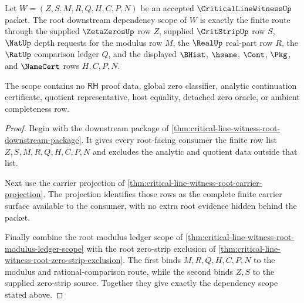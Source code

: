 \begin{theorem}
\label{thm:critical-line-witness-root-dependency-scope}
Let $W=(Z,S,M,R,Q,H,C,P,N)$ be an accepted $\CriticalLineWitnessUp$ packet.
The root downstream dependency scope of $W$ is exactly the finite route through
the supplied $\ZetaZerosUp$ row $Z$, supplied $\CritStripUp$ row $S$,
$\NatUp$ depth requests for the modulus row $M$, the $\RealUp$ real-part row
$R$, the $\RatUp$ comparison ledger $Q$, and the displayed $\BHist$,
$\hsame$, $\Cont$, $\Pkg$, and $\NameCert$ rows $H,C,P,N$.

The scope contains no $\mathsf{RH}$ proof data, global zero classifier, analytic
continuation certificate, quotient representative, host equality, detached zero
oracle, or ambient completeness row.
\end{theorem}
\begin{proof}
Begin with the downstream package of
\autoref{thm:critical-line-witness-root-downstream-package}. It gives every
root-facing consumer the finite row list $Z,S,M,R,Q,H,C,P,N$ and excludes the
analytic and quotient data outside that list.

Next use the carrier projection of
\autoref{thm:critical-line-witness-root-carrier-projection}. The projection
identifies those rows as the complete finite carrier surface available to the
consumer, with no extra root evidence hidden behind the packet.

Finally combine the root modulus ledger scope of
\autoref{thm:critical-line-witness-root-modulus-ledger-scope} with the root
zero-strip exclusion of
\autoref{thm:critical-line-witness-root-zero-strip-exclusion}. The first binds
$M,R,Q,H,C,P,N$ to the modulus and rational-comparison route, while the second
binds $Z,S$ to the supplied zero-strip source. Together they give exactly the
dependency scope stated above.
\end{proof}

